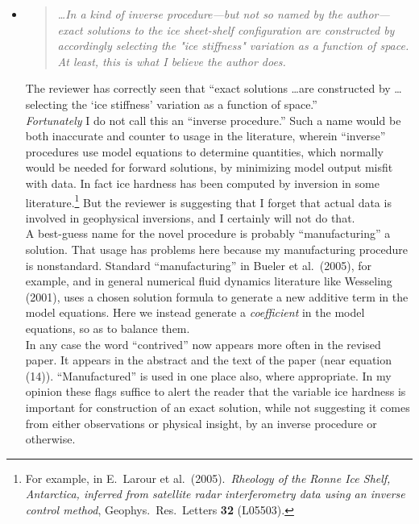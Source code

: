 \documentclass[11pt,reqno]{amsart}
\newcommand{\reply}[2]{
\medskip\medskip
\item  \begin{quote}
\emph{#1}
\end{quote}

\medskip
\noindent #2}
\begin{document}
\begin{itemize}
\reply{\dots In a kind of inverse procedure---but not so named by the author---exact solutions to the ice sheet-shelf configuration are constructed by accordingly selecting the "ice stiffness" variation as a function of space. At least, this is what I believe the author does.}
{The reviewer has correctly seen that ``exact solutions \dots are constructed by \dots selecting the `ice stiffness' variation as a function of space.'' \medskip \\
\emph{Fortunately} I do not call this an ``inverse procedure.''  Such a name would be both inaccurate and counter to usage in the literature, wherein ``inverse'' procedures use model equations to determine quantities, which normally would be needed for forward solutions, by minimizing model output misfit with data.  In fact ice hardness has been computed by inversion in some literature.\footnote{For example, in E.~Larour et al.~(2005).~\emph{Rheology of the Ronne Ice Shelf, Antarctica, inferred from satellite radar interferometry data using an inverse control method}, Geophys.~Res.~Letters \textbf{32} (L05503).}   But the reviewer is suggesting that I forget that actual data is involved in geophysical inversions, and I certainly will not do that. \medskip \\
A best-guess name for the novel procedure is probably ``manufacturing'' a solution.  That usage has problems here because my manufacturing procedure is nonstandard.  Standard ``manufacturing'' in Bueler et al.~(2005), for example, and in general numerical fluid dynamics literature like Wesseling (2001), uses a chosen solution formula to generate a new additive term in the model equations.  Here we instead generate a \emph{coefficient} in the model equations, so as to balance them. \medskip \\
In any case the word ``contrived'' now appears more often in the revised paper.  It appears in the abstract and the text of the paper (near equation (14)).  ``Manufactured'' is used in one place also, where appropriate.  In my opinion these flags suffice to alert the reader that the variable ice hardness is important for construction of an exact solution, while not suggesting it comes from either observations or physical insight, by an inverse procedure or otherwise.}


\end{itemize}
\end{document}
